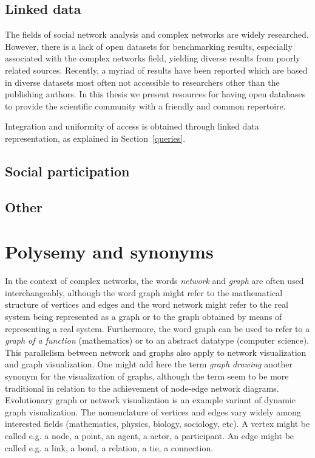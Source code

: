 \subsection{Linked data}
The fields of social network analysis and complex networks
are widely researched.
However, there is a lack of open datasets for benchmarking results,
especially associated with the complex networks field,
yielding diverse results from poorly related sources.
Recently, a myriad of results have been reported which are based in
diverse datasets most often not accessible to researchers other than the publishing authors.
In this thesis we present resources for having open databases to provide the scientific community with a friendly and common repertoire.

Integration and uniformity of access is obtained through linked data
representation, as explained in Section~\ref{queries}.

\subsection{Social participation}
\subsection{Other}


\section{Polysemy and synonyms}
In the context of complex networks, the words \emph{network} and \emph{graph}
are often used interchangeably, although the word graph might refer to the
mathematical structure of vertices and edges and the word network might refer to the
real system being represented as a graph or to the graph obtained by means of representing a real system.
Furthermore, the word graph can be used to refer to a \emph{graph of a function} (mathematics) or to an abstract datatype (computer science).
This parallelism between network and graphs also apply to network visualization and graph visualization.
One might add here the term \emph{graph drawing} another synonym for the visualization of graphs, although the term
seem to be more traditional in relation to the achievement of node-edge network diagrams.
Evolutionary graph or network visualization is an example variant of dynamic graph visualization.
The nomenclature of vertices and edges vary widely among interested fields (mathematics, physics, biology, sociology, etc).
A vertex might be called e.g. a node, a point, an agent, a actor, a participant.
An edge might be called e.g. a link, a bond, a relation, a tie, a connection.

